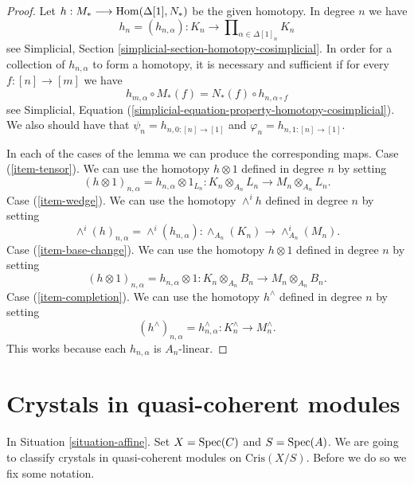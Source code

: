 \begin{proof}
Let $h : M_* \longrightarrow \mathop{\mathrm{Hom}}\nolimits(\Delta[1], N_*)$ be the given
homotopy. In degree $n$ we have
$$
h_n = (h_{n, \alpha}) :
K_n \longrightarrow
\prod\nolimits_{\alpha \in \Delta[1]_n} K_n
$$
see Simplicial, Section \ref{simplicial-section-homotopy-cosimplicial}.
In order for a collection of $h_{n, \alpha}$ to form a homotopy,
it is necessary and sufficient if for every $f : [n] \to [m]$ we
have
$$
h_{m, \alpha} \circ M_*(f) = N_*(f) \circ h_{n, \alpha \circ f}
$$
see
Simplicial, Equation (\ref{simplicial-equation-property-homotopy-cosimplicial}).
We also should have that $\psi_n = h_{n, 0 : [n] \to [1]}$ and
$\varphi_n = h_{n, 1 : [n] \to [1]}$.

\medskip\noindent
In each of the cases of the lemma we can produce the corresponding maps.
Case (\ref{item-tensor}). We can use the homotopy $h \otimes 1$ defined
in degree $n$ by setting
$$
(h \otimes 1)_{n, \alpha} = h_{n, \alpha} \otimes 1_{L_n} :
K_n \otimes_{A_n} L_n
\longrightarrow
M_n \otimes_{A_n} L_n.
$$
Case (\ref{item-wedge}). We can use the homotopy $\wedge^ih$ defined
in degree $n$ by setting
$$
\wedge^i(h)_{n, \alpha} = \wedge^i(h_{n, \alpha}) :
\wedge_{A_n}(K_n)
\longrightarrow
\wedge^i_{A_n}(M_n).
$$
Case (\ref{item-base-change}). We can use the homotopy $h \otimes 1$ defined
in degree $n$ by setting
$$
(h \otimes 1)_{n, \alpha} = h_{n, \alpha} \otimes 1 :
K_n \otimes_{A_n} B_n
\longrightarrow
M_n \otimes_{A_n} B_n.
$$
Case (\ref{item-completion}). We can use the homotopy $h^\wedge$ defined
in degree $n$ by setting
$$
(h^\wedge)_{n, \alpha} = h_{n, \alpha}^\wedge :
K_n^\wedge
\longrightarrow
M_n^\wedge.
$$
This works because each $h_{n, \alpha}$ is $A_n$-linear.
\end{proof}






\section{Crystals in quasi-coherent modules}
\label{section-quasi-coherent-crystals}

\noindent
In Situation \ref{situation-affine}.
Set $X = \mathop{\mathrm{Spec}}(C)$ and $S = \mathop{\mathrm{Spec}}(A)$. We are going to
classify crystals in quasi-coherent modules on $\text{Cris}(X/S)$.
Before we do so we fix some notation.

